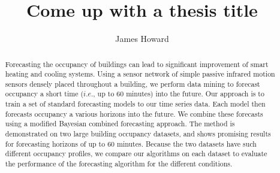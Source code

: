 \documentclass[letterpaper,12pt]{article}
\title{Come up with a thesis title}
\author{James Howard}
\begin{document}
\frontmatter

\maketitle
\newpage


\makecopyright{\the\year}
\newpage


\makesubmittal
\newpage


\begin{abstract}
Forecasting the occupancy of buildings can lead to significant improvement of smart heating and cooling systems. Using a sensor network of simple passive infrared motion sensors densely placed throughout a building, we perform data mining to forecast occupancy a short time ($i.e.$, up to 60 minutes) into the future.  Our approach is to train a set of standard forecasting models to our time series data.  Each model then forecasts occupancy a various horizons into the future.  We combine these forecasts using a modified Bayesian combined forecasting approach.  The method is demonstrated on two large building occupancy datasets, and shows promising results for forecasting horizons of up to 60 minutes.  Because the two datasets have such different occupancy profiles, we compare our algorithms on each dataset to evaluate the performance of the forecasting algorithm for the different conditions.
\end{abstract}

\newpage


\tableofcontents
\newpage


\listoffiguresandtables
\newpage


\newpage

\listofabbreviations*
\newpage
\end{document}
